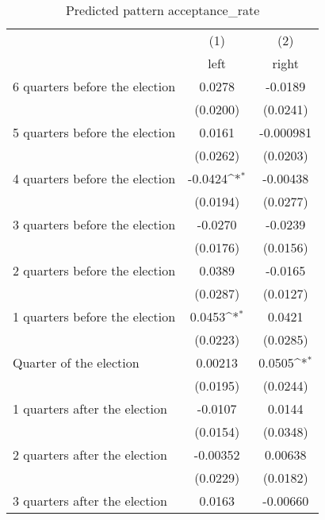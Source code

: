 \begin{table}[htbp]\centering
\def\sym#1{\ifmmode^{#1}\else\(^{#1}\)\fi}
\caption{Predicted pattern acceptance\_rate}
\begin{tabular}{l*{2}{c}}
\hline\hline
                    &\multicolumn{1}{c}{(1)}&\multicolumn{1}{c}{(2)}\\
                    &\multicolumn{1}{c}{left}&\multicolumn{1}{c}{right}\\
\hline
 6 quarters before the election&      0.0278         &     -0.0189         \\
                    &    (0.0200)         &    (0.0241)         \\
[1em]
 5 quarters before the election&      0.0161         &   -0.000981         \\
                    &    (0.0262)         &    (0.0203)         \\
[1em]
 4 quarters before the election&     -0.0424\sym{*}  &    -0.00438         \\
                    &    (0.0194)         &    (0.0277)         \\
[1em]
 3 quarters before the election&     -0.0270         &     -0.0239         \\
                    &    (0.0176)         &    (0.0156)         \\
[1em]
 2 quarters before the election&      0.0389         &     -0.0165         \\
                    &    (0.0287)         &    (0.0127)         \\
[1em]
 1 quarters before the election&      0.0453\sym{*}  &      0.0421         \\
                    &    (0.0223)         &    (0.0285)         \\
[1em]
Quarter of the election&     0.00213         &      0.0505\sym{*}  \\
                    &    (0.0195)         &    (0.0244)         \\
[1em]
 1 quarters after the election&     -0.0107         &      0.0144         \\
                    &    (0.0154)         &    (0.0348)         \\
[1em]
 2 quarters after the election&    -0.00352         &     0.00638         \\
                    &    (0.0229)         &    (0.0182)         \\
[1em]
 3 quarters after the election&      0.0163         &    -0.00660         \\

\end{tabular}
\end{table}
